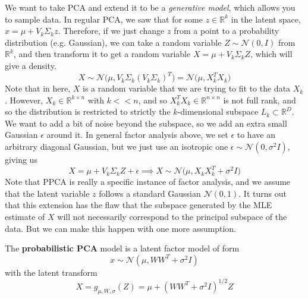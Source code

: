   We want to take PCA and extend it to be a \textit{generative model}, which allows you to sample data. In regular PCA, we saw that for some $z \in \mathbb{R}^k$ in the latent space, $\hat{x} = \mu + V_k \Sigma_k z$. Therefore, if we just change $z$ from a point to a probability distribution (e.g. Gaussian), we can take a random variable $Z \sim \mathcal{N}(0, I)$ from $\mathbb{R}^k$, and then transform it to get a random variable $X = \mu + V_k \Sigma_k Z$, which will give a density. 
  \begin{equation}
    X \sim \mathcal{N} \big( \mu, V_k \Sigma_k (V_k \Sigma_k)^T \big) = \mathcal{N} \big( \mu, X_k^T X_k)
  \end{equation} 
  Note that in here, $X$ is a random variable that we are trying to fit to the data $X_k$. However, $X_k \in \mathbb{R}^{k \times n}$ with $k << n$, and so $X_k^T X_k \in \mathbb{R}^{n \times n}$ is not full rank, and so the distribution is restricted to strictly the $k$-dimensional subspace $L_k \subset \mathbb{R}^D$. We want to add a bit of noise beyond the subspace, so we add an extra small Gaussian $\epsilon$ around it. In general factor analysis above, we set $\epsilon$ to have an arbitrary diagonal Gaussian, but we just use an isotropic one $\epsilon \sim \mathcal{N}(0, \sigma^2 I )$, giving us 
  \begin{equation}
    X = \mu + V_k \Sigma_k Z + \epsilon \implies X \sim \mathcal{N} \big( \mu, X_k X_k^T + \sigma^2 I)
  \end{equation} 
  Note that PPCA is really a specific instance of factor analysis, and we assume that the latent variable $z$ follows a standard Gaussian $\mathcal{N}(0, 1)$. It turns out that this extension has the flaw that the subspace generated by the MLE estimate of $X$ will not necessarily correspond to the principal subspace of the data. But we can make this happen with one more assumption. 

  \begin{definition} 
    The \textbf{probabilistic PCA} model is a latent factor model of form  
    \begin{equation}
      x \sim \mathcal{N}(\mu, W W^T + \sigma^2 I) 
    \end{equation} 
    with the latent transform 
    \begin{equation}
      X = g_{\mu, W, \sigma} (Z) = \mu + (WW^T + \sigma^2 I )^{1/2} Z
    \end{equation}
  \end{definition} 


